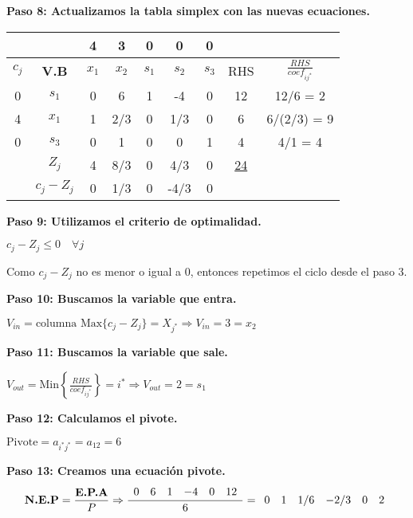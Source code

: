 \documentclass{templateNote}
\begin{document}
\textbf{Paso 8: Actualizamos la tabla simplex con las nuevas ecuaciones.}
\begin{center}
    \begin{tabular}{|c|c|c|c|c|c|c|c|c|}
        \hline
        & & 4 & 3 & 0 & 0 & 0 &  &  \\ \hline
        $c_j$ & \textbf{V.B} & $x_1$ & $x_2$ & $s_1$ & $s_2$ & $s_3$ & RHS & $\displaystyle\frac{RHS}{coef_{ij^*}}$ \\ \hline
        0 & $s_1$ & 0 & 6 & 1 & -4 & 0 & 12 & 12/6 = 2\\ \hline
        4 & $x_1$ & 1 & 2/3 & 0 & 1/3 & 0 & 6 & 6/(2/3) = 9\\ \hline
        0 & $s_3$ & 0 & 1 & 0 & 0 & 1 & 4 & 4/1 = 4\\ \hline
        & $Z_j$ & 4 & 8/3 & 0 & 4/3 & 0 & \underline{24} &  \\ \hline
        & $c_j - Z_j$ & 0 & 1/3 & 0 & -4/3 & 0 &  &  \\ \hline
    \end{tabular}
\end{center}

\textbf{Paso 9: Utilizamos el criterio de optimalidad.}
\begin{center}
    $c_j - Z_j \leq 0 \quad \forall j$
\end{center}

Como $c_j - Z_j$ no es menor o igual a 0, entonces repetimos el ciclo desde el paso 3.

\textbf{Paso 10: Buscamos la variable que entra.}
\begin{center}
    $V_{in} = \text{columna Max} \{c_j-Z_j\} = X_{j^*} \Rightarrow V_{in} = 3= x_2$
\end{center}

\textbf{Paso 11: Buscamos la variable que sale.}
\begin{center}
    $V_{out} = \text{Min} \left\{ \frac{RHS}{coef_{ij^*}} \right\} = i^* \Rightarrow V_{out} = 2 = s_1$
\end{center}

\textbf{Paso 12: Calculamos el pivote.}
\begin{center}
    $\text{Pivote} = a_{i^*j^*} = a_{12} = 6$
\end{center}

\textbf{Paso 13: Creamos una ecuación pivote.}
\begin{equation*}
    \textbf{N.E.P} = \frac{\textbf{E.P.A}}{P} \\
    \Rightarrow \frac{\begin{array}{cccccc} 0 & 6 & 1 & -4 & 0 & 12 \end{array}}{6} = \begin{array}{cccccc} 0 & 1 & 1/6 & -2/3 & 0 & 2 \end{array}
\end{equation*}
\end{document}
